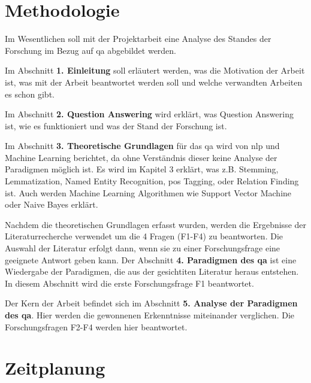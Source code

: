 \documentclass[
        ngerman,
        paper=a4,
        numbers=noendperiod,
]{scrreprt}
\begin{document}
\chapter{Methodologie}


Im Wesentlichen soll mit der Projektarbeit eine Analyse des Standes der Forschung im Bezug auf \ac{qa} abgebildet werden.

Im Abschnitt \textbf{1. Einleitung} soll erläutert werden, was die Motivation der Arbeit ist, was mit der Arbeit beantwortet werden soll und welche verwandten Arbeiten es schon gibt.

Im Abschnitt \textbf{2. Question Answering} wird erklärt, was Question Answering ist, wie es funktioniert und was der Stand der Forschung ist.

Im Abschnitt \textbf{3. Theoretische Grundlagen} für das \ac{qa} wird von \ac{nlp} und Machine Learning berichtet, da ohne Verständnis dieser keine Analyse der Paradigmen möglich ist. Es wird im Kapitel 3 erklärt, was z.B. Stemming, Lemmatization, Named Entity Recognition, \ac{pos} Tagging, oder Relation Finding ist. Auch werden Machine Learning Algorithmen wie Support Vector Machine oder Naive Bayes erklärt. 

Nachdem die theoretischen Grundlagen erfasst wurden, werden die Ergebnisse der Literaturrecherche verwendet um die 4 Fragen (F1-F4) zu beantworten. Die Auswahl der Literatur erfolgt dann, wenn sie zu einer Forschungsfrage eine geeignete Antwort geben kann. Der Abschnitt \textbf{4. Paradigmen des \ac{qa}} ist eine Wiedergabe der Paradigmen, die aus der gesichtiten Literatur heraus entstehen. In diesem Abschnitt wird die erste Forschungsfrage F1 beantwortet.

Der Kern der Arbeit befindet sich im Abschnitt \textbf{5. Analyse der Paradigmen des \ac{qa}}. Hier werden die gewonnenen Erkenntnisse miteinander verglichen. Die Forschungsfragen F2-F4 werden hier beantwortet.



\chapter{Zeitplanung}
\end{document}
